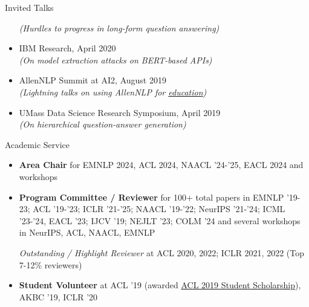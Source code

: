 \documentclass{resume} %
\begin{document}
\begin{rSection}{Invited Talks}
\begin{itemize}[leftmargin=*]
\textit{(Hurdles to progress in long-form question answering)}
\item IBM Research, April 2020\\
\textit{(On model extraction attacks on BERT-based APIs)}
\item AllenNLP Summit at AI2, August 2019 \\
\textit{(Lightning talks on using AllenNLP for \href{https://github.com/martiansideofthemoon/allennlp-probe-hw}{education})}
\item UMass Data Science Research Symposium, April 2019 \\
\textit{(On hierarchical question-answer generation)}
\end{itemize}
\end{rSection}

\begin{rSection}{Academic Service}
\vspace*{0.1in}
\begin{itemize}[leftmargin=*]

\item \textbf{Area Chair} for EMNLP 2024, ACL 2024, NAACL '24-'25, EACL 2024 and workshops

\item \textbf{Program Committee / Reviewer} for 100+ total papers in EMNLP '19-23; ACL '19-'23; ICLR '21-'25; NAACL '19-'22; NeurIPS '21-'24; ICML '23-'24, EACL '23; IJCV '19; NEJLT '23; COLM '24 and several workshops in NeurIPS, ACL, NAACL, EMNLP

\emph{Outstanding / Highlight Reviewer} at ACL 2020, 2022; ICLR 2021, 2022  (Top 7-12\% reviewers)

\item \textbf{Student Volunteer} at ACL '19 (awarded \href{http://www.acl2019.org/EN/student-scholarship-applications-volunteers.xhtml}{ACL 2019 Student Scholarship}), AKBC '19, ICLR '20
\end{itemize}
\end{rSection}

\vspace*{0.1in}
\end{document}
